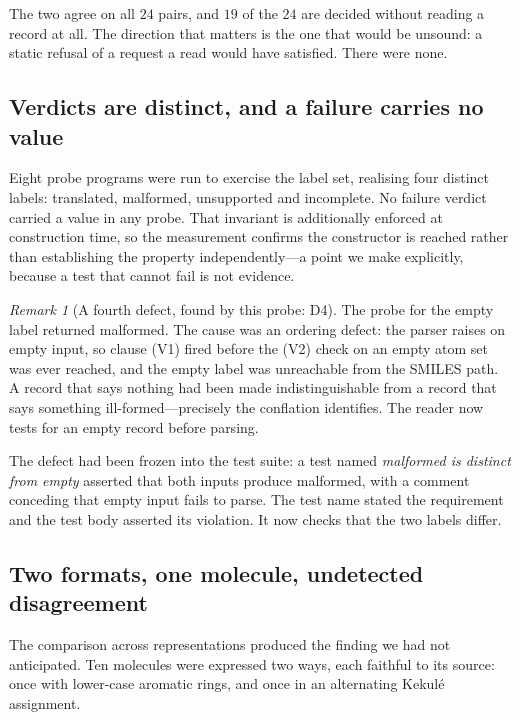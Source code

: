 \documentclass[11pt,twocolumn,a4paper]{article}
\theoremstyle{msthm}
\theoremstyle{definition}
\theoremstyle{remark}
\newtheorem{remark}[theorem]{Remark}
\begin{document}
The two agree on all $24$ pairs, and $19$ of the $24$ are decided
without reading a record at all. The direction that matters is the one
that would be unsound: a static refusal of a request a read would have
satisfied. There were none.

\subsection{Verdicts are distinct, and a failure carries no value}

Eight probe programs were run to exercise the label set, realising four
distinct labels: \textsf{translated}, \textsf{malformed},
\textsf{unsupported} and \textsf{incomplete}. No failure verdict carried
a value in any probe. That invariant is additionally enforced at
construction time, so the measurement confirms the constructor is
reached rather than establishing the property independently---a point we
make explicitly, because a test that cannot fail is not evidence.

\begin{remark}[A fourth defect, found by this probe: D4]
\label{rem:d4}
The probe for the \textsf{empty} label returned \textsf{malformed}. The
cause was an ordering defect: the parser raises on empty input, so
clause (V1) fired before the (V2) check on an empty atom set was ever
reached, and the \textsf{empty} label was unreachable from the SMILES
path. A record that says nothing had been made indistinguishable from a
record that says something ill-formed---precisely the conflation
 identifies. The reader now tests for an empty
record before parsing.

The defect had been frozen into the test suite: a test named
\emph{malformed is distinct from empty} asserted that both inputs
produce \textsf{malformed}, with a comment conceding that empty input
fails to parse. The test name stated the requirement and the test body
asserted its violation. It now checks that the two labels differ.
\end{remark}

\subsection{Two formats, one molecule, undetected disagreement}
\label{sec:disagreement}

The comparison across representations produced the finding we had not
anticipated. Ten molecules were expressed two ways, each faithful to its
source: once with lower-case aromatic rings, and once in an alternating
Kekul\'e assignment.
\end{document}

